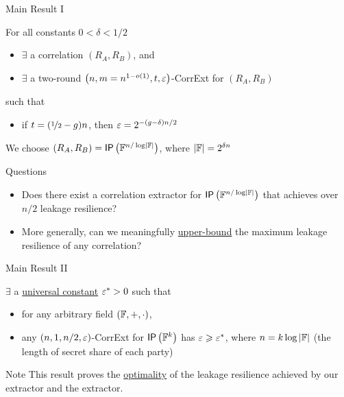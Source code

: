 \begin{frame}{Main Result I}
	\begin{theorem}
	\label{thm:construction}
	For all constants $0<\delta<1/2$
	\begin{itemize}
		\item $ \exists $ a correlation $(R_A,R_B)$, and
		\item $ \exists $ a two-round $\left(n,m = n^{1-o(1)},t,\varepsilon\right)$-CorrExt for $(R_A,R_B)$
	\end{itemize}
	such that 
	\begin{itemize}
		\item if $t=(\nicefrac12-g)n$, then $\varepsilon=2^{-(g-\delta)n/2}$
	\end{itemize} 
	\end{theorem}
	\pause
	We choose $ (R_A, R_B) = \IP[\bbF^{n/ \log \abs \bbF}] $, where $ \left\vert{\ensuremath{{\mathbb F}}}\right\vert = 2^{\delta n} $
	\pause 
	{
	\begin{block}{Questions}
		\begin{itemize}
		\item Does there exist a correlation extractor for $ \IP[\bbF^{n/ \log \abs \bbF}] $ that achieves over $ n/2 $ leakage resilience? \pause
		\item More generally, can we meaningfully \underline{upper-bound} the maximum leakage resilience of any correlation? 
		\end{itemize}
	\end{block}
	}
\end{frame}



\begin{frame}{Main Result II}
	\begin{theorem}
	\label{thm:hardness} 
	$ \exists $ a \underline{universal constant} $\varepsilon^*>0$ such that
	\begin{itemize}
		\item for any arbitrary field $({\mathbb F},+,\cdot)$,
		\item any $(n,1,%
		n/2,\eps)$-CorrExt for $ \IP [\bbF^k] $ has $\varepsilon\geqslant\varepsilon^*$, where $n=k\log\left\vert{\ensuremath{{\mathbb F}}}\right\vert$ (the length of secret share of each party)  
	\end{itemize}
\end{theorem}

{
\begin{block}{Note}
	This result proves the \underline{optimality} of the leakage resilience achieved by our extractor and the \cite{C:GIMS15} extractor.
\end{block}}

\end{frame}